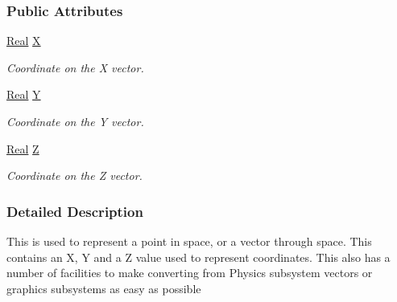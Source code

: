 \subsubsection*{Public Attributes}
\begin{DoxyCompactItemize}
\item 
\hypertarget{classphys_1_1Vector3_a23660f9d1e21a25c53aa06aa737bb56b}{
\hyperlink{namespacephys_af7eb897198d265b8e868f45240230d5f}{Real} \hyperlink{classphys_1_1Vector3_a23660f9d1e21a25c53aa06aa737bb56b}{X}}
\label{classphys_1_1Vector3_a23660f9d1e21a25c53aa06aa737bb56b}

\begin{DoxyCompactList}\small\item\em Coordinate on the X vector. \item\end{DoxyCompactList}\item 
\hypertarget{classphys_1_1Vector3_a6c9bc2ab0995d5056dba8272c650e58e}{
\hyperlink{namespacephys_af7eb897198d265b8e868f45240230d5f}{Real} \hyperlink{classphys_1_1Vector3_a6c9bc2ab0995d5056dba8272c650e58e}{Y}}
\label{classphys_1_1Vector3_a6c9bc2ab0995d5056dba8272c650e58e}

\begin{DoxyCompactList}\small\item\em Coordinate on the Y vector. \item\end{DoxyCompactList}\item 
\hypertarget{classphys_1_1Vector3_a53c84fa4b38fb9c4a4d822b04c200b13}{
\hyperlink{namespacephys_af7eb897198d265b8e868f45240230d5f}{Real} \hyperlink{classphys_1_1Vector3_a53c84fa4b38fb9c4a4d822b04c200b13}{Z}}
\label{classphys_1_1Vector3_a53c84fa4b38fb9c4a4d822b04c200b13}

\begin{DoxyCompactList}\small\item\em Coordinate on the Z vector. \item\end{DoxyCompactList}\end{DoxyCompactItemize}


\subsubsection{Detailed Description}
This is used to represent a point in space, or a vector through space. This contains an X, Y and a Z value used to represent coordinates. This also has a number of facilities to make converting from Physics subsystem vectors or graphics subsystems as easy as possible 

